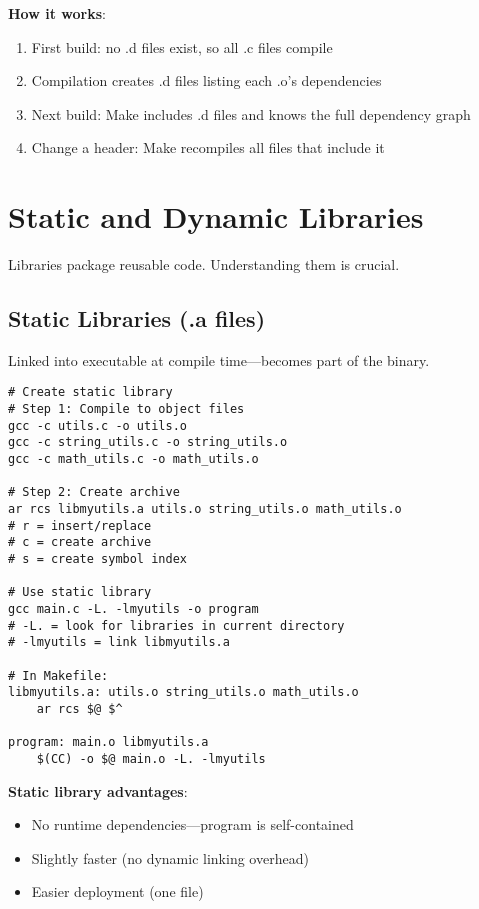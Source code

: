 \textbf{How it works}:

\begin{enumerate}
    \item First build: no .d files exist, so all .c files compile
    \item Compilation creates .d files listing each .o's dependencies
    \item Next build: Make includes .d files and knows the full dependency graph
    \item Change a header: Make recompiles all files that include it
\end{enumerate}

\section{Static and Dynamic Libraries}

Libraries package reusable code. Understanding them is crucial.

\subsection{Static Libraries (.a files)}

Linked into executable at compile time---becomes part of the binary.

\begin{lstlisting}
# Create static library
# Step 1: Compile to object files
gcc -c utils.c -o utils.o
gcc -c string_utils.c -o string_utils.o
gcc -c math_utils.c -o math_utils.o

# Step 2: Create archive
ar rcs libmyutils.a utils.o string_utils.o math_utils.o
# r = insert/replace
# c = create archive
# s = create symbol index

# Use static library
gcc main.c -L. -lmyutils -o program
# -L. = look for libraries in current directory
# -lmyutils = link libmyutils.a

# In Makefile:
libmyutils.a: utils.o string_utils.o math_utils.o
	ar rcs $@ $^

program: main.o libmyutils.a
	$(CC) -o $@ main.o -L. -lmyutils
\end{lstlisting}

\textbf{Static library advantages}:
\begin{itemize}
    \item No runtime dependencies---program is self-contained
    \item Slightly faster (no dynamic linking overhead)
    \item Easier deployment (one file)
\end{itemize}

